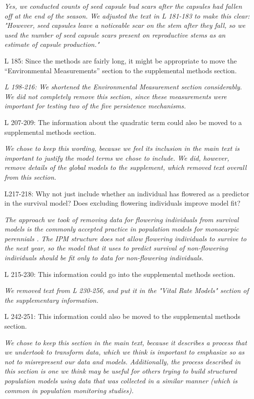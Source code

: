 \documentclass[12pt, letterpaper]{article}
\begin{document}
\begin{flushleft}
\textit{Yes, we conducted counts of seed capsule bud scars after the capsules had fallen off at the end of the season. We adjusted the text in L 181-183 to make this clear: "However, seed capsules leave a noticeable scar on the stem after they fall, so we used the number of seed capsule scars present on reproductive stems as an estimate of capsule production."}

L 185: Since the methods are fairly long, it might be appropriate to move the “Environmental Measurements” section to the supplemental methods section.

\textit{L 198-216: We shortened the Environmental Measurement section considerably. We did not completely remove this section, since these measurements were important for testing two of the five persistence mechanisms. }

L 207-209: The information about the quadratic term could also be moved to a supplemental methods section.

\textit{We chose to keep this wording, because we feel its inclusion in the main text is important to justify the model terms we chose to include. We did, however, remove details of the global models to the supplement, which removed text overall from this section.  }

L217-218: Why not just include whether an individual has flowered as a predictor in the survival model? Does excluding flowering individuals improve model fit?

\textit{The approach we took of removing data for flowering individuals from survival models is the commonly accepted practice in population models for monocarpic perennials \cite{Ellner2016Data-drivenPopulations, Merow2014AdvancingGuide}. The IPM structure does not allow flowering individuals to survive to the next year, so the model that it uses to predict survival of non-flowering individuals should be fit only to data for non-flowering individuals.}

L 215-230: This information could go into the supplemental methods section.

\textit{We removed text from L 230-256, and put it in the "Vital Rate Models" section of the supplementary information. }

L 242-251: This information could also be moved to the supplemental methods section.

 \textit{We chose to keep this section in the main text, because it describes a process that we undertook to transform data, which we think is important to emphasize so as not to misrepresent our data and models. Additionally, the process described in this section is one we think may be useful for others trying to build structured population models using data that was collected in a similar manner (which is common in population monitoring studies).}
 

\end{flushleft}
\end{document}
